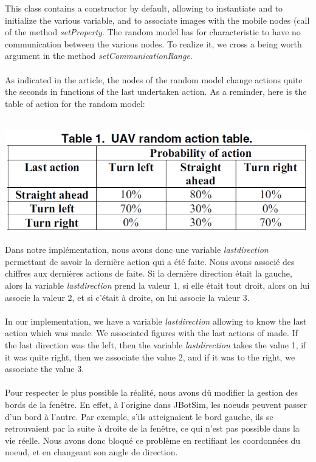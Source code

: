 This class contains a constructor by default, allowing to instantiate and to initialize the various variable, and to associate images with the mobile nodes (call of the method \textit{setProperty}. The random model has for characteristic to have no communication between the various nodes. To realize it, we cross a being worth argument  in the method \textit{setCommunicationRange}. \\\\
As indicated in the article, the nodes of the random model change actions quite the seconds in functions of the last undertaken action. As a reminder, here is the table of action for the random model: \\\\
\begin{center}
\includegraphics{../images/table_random.png}
\end{center}

Dans notre implémentation, nous avons donc une variable \textit{lastdirection} permettant de savoir la dernière action qui a été faite. Nous avons associé des chiffres aux dernières actions de faite. Si la dernière direction était la gauche, alors la variable \textit{lastdirection} prend la valeur 1, si elle était tout droit, alors on lui associe la valeur 2, et si c'était à droite, on lui associe la valeur 3.\\\\

In our implementation, we have a variable \textit{lastdirection} allowing to know the last action which was made. We associated figures with the last actions of made. If the last direction was the left, then the variable \textit {lastdirection} takes the value 1, if it was quite right, then we associate the value 2, and if it was to the right, we associate the value 3. \\\\

Pour respecter le plus possible la réalité, nous avons dû modifier la gestion des bords de la fenêtre. En effet, à l'origine dans JBotSim, les noeuds peuvent passer d'un bord à l'autre. Par exemple, s'ils atteignaient le bord gauche, ils se retrouvaient par la suite à droite de la fenêtre, ce qui n'est pas possible dans la vie réelle. Nous avons donc bloqué ce problème en rectifiant les coordonnées du noeud, et en changeant son angle de direction. \\\\

